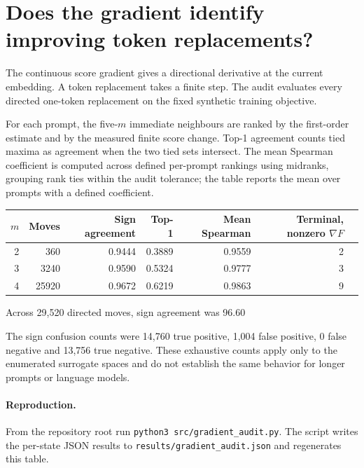 \section{Does the gradient identify improving token replacements?}
The continuous score gradient gives a directional derivative at the current
embedding. A token replacement takes a finite step. The audit evaluates every
directed one-token replacement on the fixed synthetic training objective.

For each prompt, the five-$m$ immediate neighbours are ranked by the
first-order estimate and by the measured finite score change. Top-1 agreement
counts tied maxima as agreement when the two tied sets intersect. The mean
Spearman coefficient is computed across defined per-prompt rankings using
midranks, grouping rank ties within the audit tolerance; the table reports
the mean over prompts with a defined coefficient.

\begin{center}
\begin{tabular}{rrrrrrr}
\toprule
$m$ & Moves & Sign agreement & Top-1 & Mean Spearman & Terminal, nonzero $\nabla F$ \\
\midrule
2 & 360 & 0.9444 & 0.3889 & 0.9559 & 2 \\
3 & 3240 & 0.9590 & 0.5324 & 0.9777 & 3 \\
4 & 25920 & 0.9672 & 0.6219 & 0.9863 & 9 \\
\bottomrule
\end{tabular}
\end{center}

Across 29,520 directed moves, sign agreement was 96.60%

The sign confusion counts were 14,760 true positive, 1,004 false positive, 0 false negative and 13,756 true negative. These exhaustive counts apply only to the enumerated surrogate spaces and do not establish the same behavior for longer prompts or language models.

\paragraph{Reproduction.}
From the repository root run \texttt{python3 src/gradient\_audit.py}.
The script writes the per-state JSON results to
\texttt{results/gradient\_audit.json} and regenerates this table.
